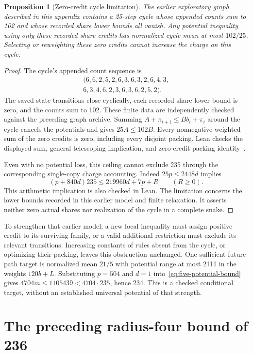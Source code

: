 \documentclass[11pt,a4paper]{article}
\newtheorem{proposition}[theorem]{Proposition}
\theoremstyle{definition}
\theoremstyle{remark}
\begin{document}
\begin{proposition}[Zero-credit cycle limitation]\label{prop:zero-credit}
The earlier exploratory graph described in this appendix contains a 25-step cycle whose appended counts sum to 102 and whose recorded share lower bounds all vanish. Any potential inequality using only these recorded share credits has normalized cycle mean at most $102/25$. Selecting or reweighting these zero credits cannot increase the charge on this cycle.
\end{proposition}
\begin{proof}
The cycle's appended count sequence is
\[
\begin{gathered}
(6,6,2,5,2,6,3,6,3,2,6,4,3,\\
6,3,4,6,2,3,6,3,6,2,5,2).
\end{gathered}
\]
The saved state transitions close cyclically, each recorded share lower bound is zero, and the counts sum to 102. These finite data are independently checked against the preceding graph archive. Summing $A+\pi_{i+1}\le B b_i+\pi_i$ around the cycle cancels the potentials and gives $25A\le102B$. Every nonnegative weighted sum of the zero credits is zero, including every disjoint packing. Lean checks the displayed sum, general telescoping implication, and zero-credit packing identity~\cite{packingarchive}.

Even with no potential loss, this ceiling cannot exclude 235 through the corresponding single-copy charge accounting. Indeed $25p\le2448d$ implies
\[
(p+840d)235\le219960d+7p+R\qquad(R\ge0).
\]
This arithmetic implication is also checked in Lean. The limitation concerns the lower bounds recorded in this earlier model and finite relaxation. It asserts neither zero actual shares nor realization of the cycle in a complete snake.
\end{proof}

To strengthen that earlier model, a new local inequality must assign positive credit to its surviving family, or a valid additional restriction must exclude its relevant transitions. Increasing constants of rules absent from the cycle, or optimizing their packing, leaves this obstruction unchanged. One sufficient future path target is normalized mean $21/5$ with potential range at most 2111 in the weights $120b+L$. Substituting $p=504$ and $d=1$ into~\eqref{eq:five-potential-bound} gives $4704m\le1105439<4704\cdot235$, hence 234. This is a checked conditional target, without an established universal potential of that strength.


\section{The preceding radius-four bound of 236}\label{app:bound236}
\end{document}
